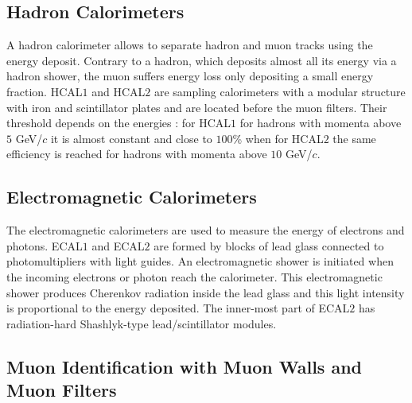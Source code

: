 \subsection{Hadron Calorimeters}

A hadron calorimeter allows to separate hadron and muon tracks using the energy deposit. Contrary to a hadron, which deposits almost all its energy via a hadron shower, the muon suffers energy loss only depositing a small energy fraction. HCAL$1$ and HCAL$2$ are sampling calorimeters with a modular structure with iron and scintillator plates and are located before the muon filters. Their threshold depends on the energies : for HCAL$1$ for hadrons with momenta above $5$ GeV/$c$ it is almost constant and close to $100$\% when for HCAL$2$ the same efficiency is reached for hadrons with momenta above $10$ GeV/$c$.

\subsection{Electromagnetic Calorimeters}

The electromagnetic calorimeters are used to measure the energy of electrons and photons. ECAL$1$ and ECAL$2$ are formed by blocks of lead glass connected to photomultipliers with light guides. An electromagnetic shower is initiated when the incoming electrons or photon reach the calorimeter. This electromagnetic shower produces Cherenkov radiation inside the lead glass and this light intensity is proportional to the energy deposited. The inner-most part of ECAL$2$ has radiation-hard Shashlyk-type lead/scintillator modules.

\subsection{Muon Identification with Muon Walls and Muon Filters}

